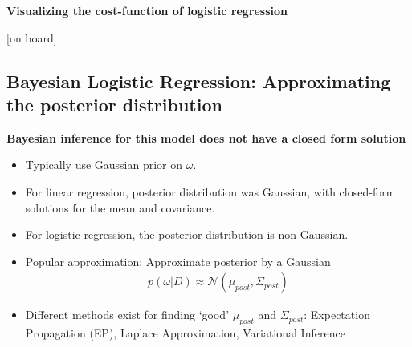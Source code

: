 \textbf{Visualizing the cost-function of logistic regression}

[on board]


\subsection{Bayesian Logistic Regression: Approximating the posterior distribution}
\textbf{Bayesian inference for this model does not have a closed form solution}
\begin{itemize}
\item Typically use Gaussian prior on $\omega$.
\item For linear regression, posterior distribution was Gaussian, with closed-form solutions for the mean and covariance.
\item For logistic regression, the posterior distribution is non-Gaussian.
\item  Popular approximation: Approximate posterior by a Gaussian
\begin{align}
p(\omega|D) \approx \mathcal{N}(\mu_{post}, \Sigma_{post})
\end{align}
\item  Different methods exist for finding `good' $\mu_{post}$ and $\Sigma_{post}$: Expectation Propagation (EP), Laplace Approximation, Variational Inference
\end{itemize}

